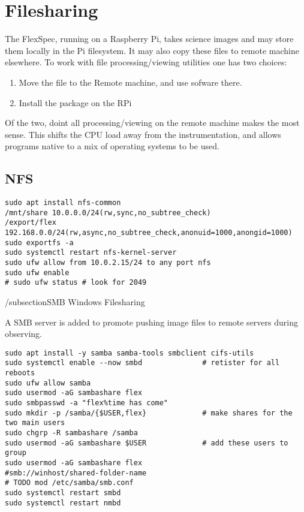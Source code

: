 \section{Filesharing}

The FlexSpec, running on a Raspberry Pi, takes science images and may
store them locally in the Pi filesystem. It may also copy these files
to remote machine elsewhere. To work with file processing/viewing utilities
one has two choices:
\vspace{-.15cm}
\begin{enumerate}\addtolength{\itemsep}{-0.5\baselineskip}
   \item   Move the file to the Remote machine, and use sofware there.
   \item   Install the package on the RPi
\end{enumerate}

Of the two, doint all processing/viewing on the remote machine makes the most
sense. This shifts the CPU load away from the instrumentation, and allows
programs native to a mix of operating systems to be used.

\subsection{NFS}



\begingroup \fontsize{10pt}{10pt}
\selectfont
\begin{verbatim} 
sudo apt install nfs-common
/mnt/share 10.0.0.0/24(rw,sync,no_subtree_check)
/export/flex 192.168.0.0/24(rw,async,no_subtree_check,anonuid=1000,anongid=1000)
sudo exportfs -a
sudo systemctl restart nfs-kernel-server
sudo ufw allow from 10.0.2.15/24 to any port nfs
sudo ufw enable
# sudo ufw status # look for 2049
\end{verbatim}
\endgroup



/subsection{SMB Windows Filesharing}

A SMB server is added to promote pushing image files to remote
servers during observing.

\begingroup \fontsize{10pt}{10pt}
\selectfont
\begin{verbatim} 
sudo apt install -y samba samba-tools smbclient cifs-utils
sudo systemctl enable --now smbd              # retister for all reboots
sudo ufw allow samba
sudo usermod -aG sambashare flex
sudo smbpasswd -a "flex%time has come"
sudo mkdir -p /samba/{$USER,flex}             # make shares for the two main users
sudo chgrp -R sambashare /samba
sudo usermod -aG sambashare $USER             # add these users to group
sudo usermod -aG sambashare flex
#smb://winhost/shared-folder-name
# TODO mod /etc/samba/smb.conf
sudo systemctl restart smbd
sudo systemctl restart nmbd
\end{verbatim}
\endgroup


